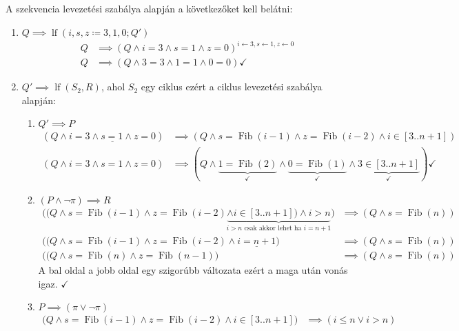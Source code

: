 \documentclass[a4paper,12pt]{article}
\DeclareMathOperator{\lf}{lf}
\begin{document}
	\begin{solution}
		A szekvencia levezetési szabálya alapján a következőket kell belátni:
		\begin{enumerate}
			\item $Q \implies \lf(i,s,z \coloneq 3,1,0;Q') $
			\begin{align*}
				Q &\implies (Q \land i=3 \land s=1 \land z = 0)^{i \leftarrow 3, s \leftarrow 1,z \leftarrow 0} \\
				Q &\implies (Q \land 3 = 3 \land 1 = 1 \land 0 = 0) \checkmark
			\end{align*}
			\vspace*{-6pt}
			\item $Q' \implies \lf(S_2,R)$, ahol $S_2$ egy ciklus ezért a ciklus levezetési szabálya alapján:
			\begin{enumerate}
				\item $Q' \implies P$
				\begin{align*}
					( Q \land \underline{ i=3 \land s=1 \land z = 0 } ) &\implies ( Q \land s = \mathop{Fib}(i-1) \land z = \mathop{Fib}(i-2) \land i \in [3..n+1] )  \\
					( Q \land i=3 \land s=1 \land z = 0 ) &\implies ( Q \land \underbrace { 1 = \mathop{Fib}(2) }_{\checkmark} \land \underbrace{0 = \mathop{Fib}(1) }_{\checkmark} \land \underbrace{ 3 \in [3..n+1] }_{\checkmark} ) \checkmark
				\end{align*}
				\item $(P \land \lnot \pi) \implies R$ 
				\begin{align*}
					\bigl( ( Q \land s = \mathop{Fib}(i-1) \land z = \mathop{Fib}(i-2) \underbrace{ \land i \in [3..n+1] ) \land i > n }_{i > n \text{ csak akkor lehet ha } i = n + 1} \bigr) &\implies (Q \land s = \mathop{Fib}(n)) \\
					\bigl( ( Q \land s = \mathop{Fib}(i-1) \land z = \mathop{Fib}(i-2) \land \underline{ i = n + 1 } \bigr) &\implies (Q \land s = \mathop{Fib}(n)) \\
					\bigl( ( Q \land s = \mathop{Fib}(n) \land z = \mathop{Fib}(n-1) \bigr) &\implies (Q \land s = \mathop{Fib}(n))
				\end{align*}
				A bal oldal a jobb oldal egy szigorúbb változata ezért a maga után vonás igaz. $\checkmark$
				\item $ P \implies (\pi \lor \lnot \pi) $
				\begin{align*}
					\bigl( Q \land s = \mathop{Fib}(i-1) \land z = \mathop{Fib}(i-2) \land i \in [3..n+1] \bigr) &\implies (i \le n \lor i > n ) \\

\end{align*}
\end{enumerate}
\end{enumerate}
\end{solution}
\end{document}
